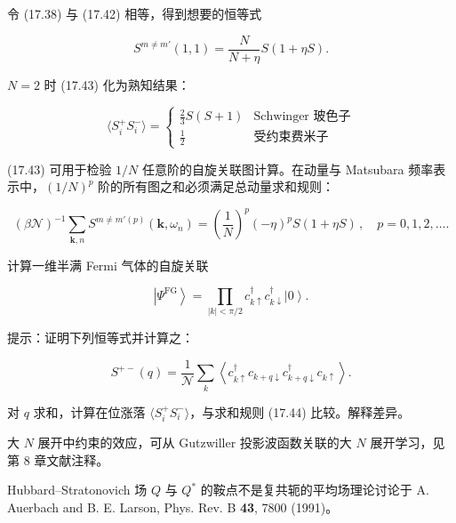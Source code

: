令 (17.38) 与 (17.42) 相等，得到想要的恒等式

\begin{equation*}
S ^ {m \neq m '} ( 1, 1 ) = \frac {N}{N + \eta} S ( 1 + \eta S ).
\tag{17.43}
\end{equation*}

$N = 2$ 时 (17.43) 化为熟知结果：

\begin{equation*}
\langle S _ {i} ^ {+} S _ {i} ^ {-} \rangle = \left\{ \begin{array}{ll} \frac {2}{3} S ( S + 1 ) & \text{Schwinger 玻色子} \\ \frac {1}{2} & \text{受约束费米子} \end{array} \right.
\tag{17.44}
\end{equation*}

(17.43) 可用于检验 $1/N$ 任意阶的自旋关联图计算。在动量与 Matsubara 频率表示中，$(1/N)^{p}$ 阶的所有图之和必须满足总动量求和规则：

\begin{equation*}
\left( \beta \mathcal {N} \right) ^ {- 1} \sum_{\mathbf {k}, n} S ^ {m \neq m' (p)} ( \mathbf {k}, \omega_ {n} ) = \left( \frac {1}{N} \right) ^ {p} \left( - \eta \right) ^ {p} S ( 1 + \eta S ) \, , \quad p = 0, 1, 2, \dots .
\tag{17.45}
\end{equation*}

\begin{exercises}

\item 计算一维半满 Fermi 气体的自旋关联

\begin{equation*}
\left| \Psi^ {\mathrm{FG}} \right\rangle = \prod_{| k | < \pi / 2} c _ {k \uparrow} ^ {\dagger} c _ {k \downarrow} ^ {\dagger} \left| 0 \right\rangle .
\tag{17.46}
\end{equation*}

提示：证明下列恒等式并计算之：

\begin{equation*}
S ^ {+-} ( q ) = \frac {1}{\mathcal {N}} \sum_ {k} \left\langle c _ {k \uparrow} ^ {\dagger} c_{k + q \downarrow} c_{k + q \downarrow} ^ {\dagger} c _ {k \uparrow} \right\rangle .
\tag{17.47}
\end{equation*}

\item 对 $q$ 求和，计算在位涨落 $\langle S_{i}^{+}S_{i}^{-}\rangle$，与求和规则 (17.44) 比较。解释差异。

\end{exercises}

\begin{chapbib}
\item 大 $N$ 展开中约束的效应，可从 Gutzwiller 投影波函数关联的大 $N$ 展开学习，见第 8 章文献注释。
\item Hubbard--Stratonovich 场 $Q$ 与 $Q^{*}$ 的鞍点不是复共轭的平均场理论讨论于
  A. Auerbach and B. E. Larson, Phys. Rev. B \textbf{43}, 7800 (1991)。
\end{chapbib}
